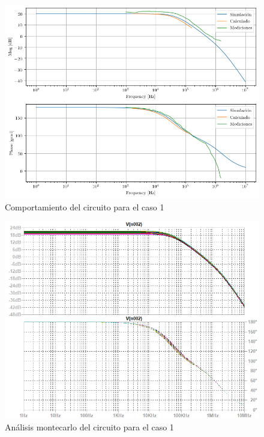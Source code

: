 \begin{figure}[H]
\begin{centering}
\includegraphics[scale=0.5]{../Ex1/iA/Resources1a/H1}
\par\end{centering}
\caption{Comportamiento del circuito para el caso 1}
\label{1_a_2}
\end{figure}

\begin{figure}[H]
\begin{centering}
\includegraphics[scale=0.5]{../Ex1/iA/Resources1a/montecarlo1a_1}
\par\end{centering}
\caption{Análisis montecarlo del circuito para el caso 1}

\end{figure}

